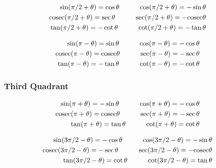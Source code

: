 \begin{align*}
\sin(\pi/2 + \theta) = \cos\theta \hspace{10mm} \cos(\pi/2 + \theta) = -\sin\theta \\
\mathrm{cosec}(\pi/2 + \theta) = \sec\theta \hspace{10mm} \sec(\pi/2 + \theta) = -\mathrm{cosec}\theta \\
\tan(\pi/2 + \theta) = -\cot\theta \hspace{10mm} \cot(\pi/2 + \theta) = -\tan\theta 
\end{align*}

\begin{align*}
\sin(\pi - \theta) = \sin\theta \hspace{10mm} \cos(\pi - \theta) = -\cos\theta \\
\mathrm{cosec}(\pi - \theta) = \mathrm{cosec}\theta \hspace{10mm} \sec(\pi - \theta) = -\sec\theta \\
\tan(\pi - \theta) = -\tan\theta \hspace{10mm} \cot(\pi - \theta) = -\cot\theta 
\end{align*}

\subsubsection{Third Quadrant}

\begin{align*}
\sin(\pi + \theta) = -\sin\theta \hspace{10mm} \cos(\pi + \theta) = -\cos\theta \\
\mathrm{cosec}(\pi + \theta) = \mathrm{cosec}\theta \hspace{10mm} \sec(\pi + \theta) = -\sec\theta \\
\tan(\pi + \theta) = \tan\theta \hspace{10mm} \cot(\pi + \theta) = \cot\theta 
\end{align*}

\begin{align*}
\sin(3\pi/2 - \theta) = -\cos\theta \hspace{10mm} \cos(3\pi/2 - \theta) = -\sin\theta \\
\mathrm{cosec}(3\pi/2 - \theta) = -\sec\theta \hspace{10mm} \sec(3\pi/2 - \theta) = -\mathrm{cosec}\theta \\
\tan(3\pi/2 - \theta) = \cot\theta \hspace{10mm} \cot(3\pi/2 - \theta) = \tan\theta 
\end{align*}

